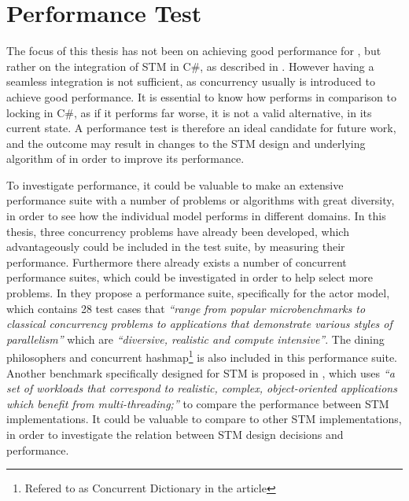 \makeatletter {}\makeatother
{}
\section{Performance Test}
The focus of this thesis has not been on achieving good performance for \stmname, but rather on the integration of \ac{STM} in C\#, as described in . However having a seamless integration is not sufficient, as concurrency usually is introduced to achieve good performance. It is essential to know how \stmname performs in comparison to locking in C\#, as if it performs far worse, it is not a valid alternative, in its current state. A performance test is therefore an ideal candidate for future work, and the outcome may result in changes to the \ac{STM} design and underlying algorithm of \stmname in order to improve its performance.

To investigate performance, it could be valuable to make an extensive performance suite with a number of problems or algorithms with great diversity, in order to see how the individual model performs in different domains. In this thesis, three concurrency problems have already been developed, which advantageously could be included in the test suite, by measuring their performance. Furthermore there already exists a number of concurrent performance suites, which could be investigated in order to help select more problems. In \cite{imam2014savina} they propose a performance suite, specifically for the actor model, which contains 28 test cases that \textit{``range from popular microbenchmarks to classical concurrency problems to applications that demonstrate various styles of parallelism''} which are \textit{``diversive, realistic and compute intensive''}. The dining philosophers and concurrent hashmap\footnote{Refered to as Concurrent Dictionary in the article} is also included in this performance suite. Another benchmark specifically designed for \ac{STM} is proposed in \cite{guerraoui2006stmbench7}, which uses \textit{``a set of workloads that correspond to realistic, complex, object-oriented applications which benefit from multi-threading;''} to compare the performance between \ac{STM} implementations. It could be valuable to compare \stmname to other \ac{STM} implementations, in order to investigate the relation between \ac{STM} design decisions and performance.

